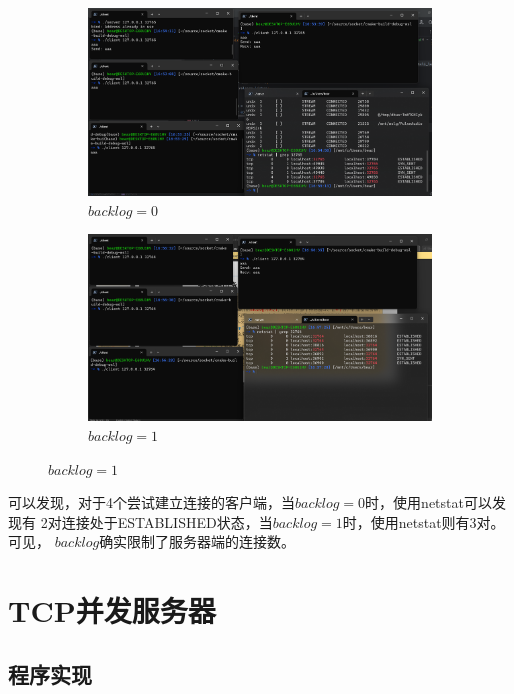 \documentclass[a4paper,twoside]{article}
\begin{document}
\begin{spacing}{1.2}
\begin{figure}[htbp]
	\centering
	\caption{不同的$backlog$}
	\label{fig:acc}
	\begin{subfigure}{0.4\textwidth}
		\centering
		\includegraphics[width=\textwidth]{iter_bl0.png}
		\caption{$backlog=0$}
		\label{fig:bl0}
	\end{subfigure}
	\begin{subfigure}{0.4\textwidth}
		\centering
		\includegraphics[width=\textwidth]{iter_bl1.png}
		\caption{$backlog=1$}
		\label{fig:bl1}
	\end{subfigure}
\end{figure}

可以发现，对于4个尝试建立连接的客户端，当$backlog=0$时，使用netstat可以发现有
2对连接处于ESTABLISHED状态，当$backlog=1$时，使用netstat则有3对。可见，
$backlog$确实限制了服务器端的连接数。

\section{TCP并发服务器}


\subsection{程序实现}


\end{spacing}
\end{document}
